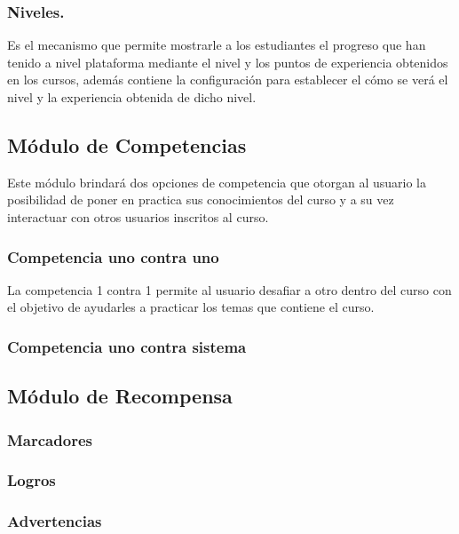 \subsubsection{Niveles.}

 Es el mecanismo que permite mostrarle a los estudiantes el progreso que han tenido
 a nivel plataforma mediante el nivel y los puntos de experiencia obtenidos en
 los cursos, además contiene la configuración para establecer el cómo se verá el
 nivel y la experiencia obtenida de dicho nivel.

%

\subsection{Módulo de Competencias}

  Este módulo brindará dos opciones de competencia que otorgan al usuario
  la posibilidad de poner en practica sus conocimientos del curso y a su vez interactuar
  con otros usuarios inscritos al curso.

\subsubsection{Competencia uno contra uno}

La competencia 1 contra 1 permite al usuario desafiar a otro dentro del curso con
el objetivo de ayudarles a practicar los temas que contiene el curso.

\subsubsection{Competencia uno contra sistema}

\subsection{Módulo de Recompensa}

\subsubsection{Marcadores}
\subsubsection{Logros}
\subsubsection{Advertencias}

